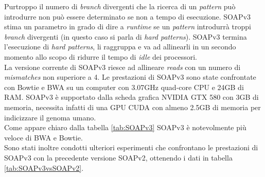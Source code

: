 \documentclass[conference]{IEEEtran}
\begin{document}
Purtroppo il numero di \textit{branch} divergenti che la ricerca di un \textit{pattern} può introdurre non può essere determinato se non a tempo di esecuzione. SOAPv3 stima un parametro in grado di dire a \textit{runtime} se un \textit{pattern} introdurrà troppi \textit{branch} divergenti (in questo caso si parla di \textit{hard patterns}). SOAPv3 termina l'esecuzione di \textit{hard patterns}, li raggruppa e va ad allinearli in un secondo momento allo scopo di ridurre il tempo di \textit{idle} dei processori.\\

La versione corrente di SOAPv3 riesce ad allineare \textit{reads} con un numero di \textit{mismatches} non superiore a 4. Le prestazioni di SOAPv3 sono state confrontate con Bowtie e BWA su un computer con 3.07GHz quad-core CPU e 24GB di RAM. SOAPv3 è supportato dalla scheda grafica NVIDIA GTX 580 con 3GB di memoria, necessita infatti di una GPU CUDA con almeno 2.5GB di memoria per indicizzare il genoma umano.\\

Come appare chiaro dalla tabella \ref{tab:SOAPv3} SOAPv3 è notevolmente più veloce di BWA e Bowtie.\\
Sono stati inoltre condotti ulteriori esperimenti che confrontano le prestazioni di SOAPv3 con la precedente versione SOAPv2, ottenendo i dati in tabella \ref{tab:SOAPv3vsSOAPv2}.\\
\end{document}
